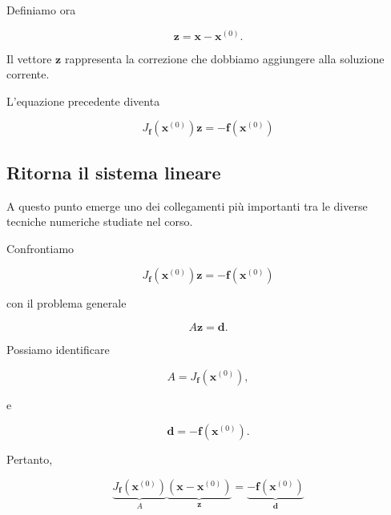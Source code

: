 Definiamo ora

\begin{equation*}
    \mathbf{z}
    =
    \mathbf{x}-\mathbf{x}^{(0)}.
    \label{eq:newton-correction}
\end{equation*}

Il vettore $\mathbf{z}$ rappresenta la correzione che dobbiamo
aggiungere alla soluzione corrente.

L'equazione precedente diventa

\begin{equation*}
J_{\mathbf{f}}(\mathbf{x}^{(0)})
\mathbf{z}
=
-\mathbf{f}(\mathbf{x}^{(0)})
\label{eq:newton-linear-system}
\end{equation*}


\subsection{Ritorna il sistema lineare}

A questo punto emerge uno dei collegamenti più importanti tra le
diverse tecniche numeriche studiate nel corso.

Confrontiamo

\begin{equation*}
    J_{\mathbf{f}}(\mathbf{x}^{(0)})
    \mathbf{z}
    =
    -\mathbf{f}(\mathbf{x}^{(0)})
\end{equation*}

con il problema generale

\begin{equation*}
    A\mathbf{z}=\mathbf{d}.
\end{equation*}

Possiamo identificare

\begin{equation*}
    A
    =
    J_{\mathbf{f}}(\mathbf{x}^{(0)}),
\end{equation*}

e

\begin{equation*}
    \mathbf{d}
    =
    -\mathbf{f}(\mathbf{x}^{(0)}).
\end{equation*}

Pertanto,

\begin{equation*}
\underbrace{
J_{\mathbf{f}}(\mathbf{x}^{(0)})
}_{A}
\underbrace{
\left(
\mathbf{x}-\mathbf{x}^{(0)}
\right)
}_{\mathbf{z}}
=
\underbrace{
-\mathbf{f}(\mathbf{x}^{(0)})
}_{\mathbf{d}}
\end{equation*}

